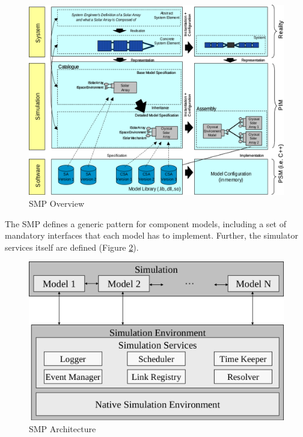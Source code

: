 \begin{figure}[h]
\centering\includegraphics[scale=0.35]{fig/smp_overview}
\caption{SMP Overview}
\label{fig:SMP Overview}
\end{figure}

The SMP defines a generic pattern for component models, including a set of mandatory interfaces that each model has to implement. Further, the simulator services itself are defined (Figure \ref{fig:SMP Architecture}).

\begin{figure}[h]
\centering\includegraphics[scale=0.3]{fig/smp_architecture}
\caption{SMP Architecture}
\label{fig:SMP Architecture}
\end{figure}
